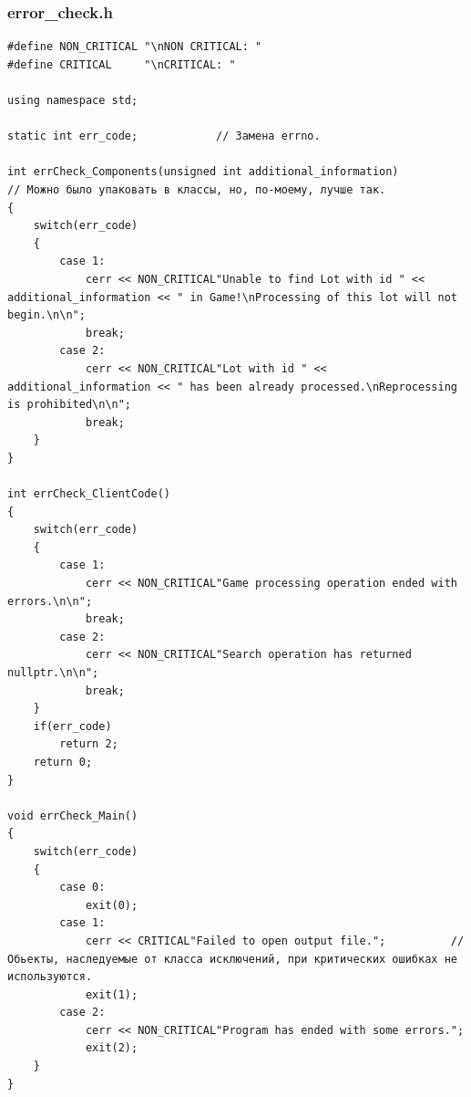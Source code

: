 \documentclass[a4paper,14pt]{article}
\begin{document}
\subsubsection{error\_check.h}
\begin{verbatim}
#define NON_CRITICAL "\nNON CRITICAL: "
#define CRITICAL     "\nCRITICAL: "

using namespace std;

static int err_code;            // Замена errno.

int errCheck_Components(unsigned int additional_information)          // Можно было упаковать в классы, но, по-моему, лучше так.
{
    switch(err_code)
    {
        case 1:
            cerr << NON_CRITICAL"Unable to find Lot with id " << additional_information << " in Game!\nProcessing of this lot will not begin.\n\n";
            break;
        case 2:
            cerr << NON_CRITICAL"Lot with id " << additional_information << " has been already processed.\nReprocessing is prohibited\n\n";
            break;
    }
}

int errCheck_ClientCode()
{
    switch(err_code)
    {
        case 1:
            cerr << NON_CRITICAL"Game processing operation ended with errors.\n\n";
            break;
        case 2:
            cerr << NON_CRITICAL"Search operation has returned nullptr.\n\n";
            break;
    }
    if(err_code)
        return 2;
    return 0;
}

void errCheck_Main()
{
    switch(err_code)
    {
        case 0:
            exit(0);
        case 1:
            cerr << CRITICAL"Failed to open output file.";          // Обьекты, наследуемые от класса исключений, при критических ошибках не используются.
            exit(1);
        case 2:
            cerr << NON_CRITICAL"Program has ended with some errors.";
            exit(2);
    }
}
\end{verbatim}
\end{document}

